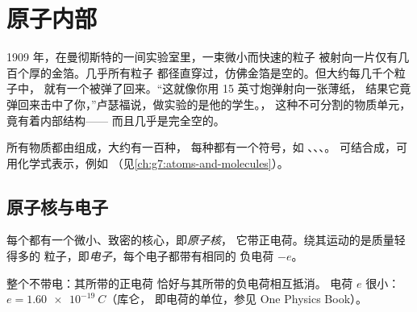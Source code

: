 \chapter{原子内部}\label{ch:g9:inside-the-atom}

1909 年，在曼彻斯特的一间实验室里，一束微小而快速的粒子
被射向一片仅有几百个厚的金箔。几乎所有粒子
都径直穿过，仿佛金箔是空的。但大约每几千个粒子中，
就有一个被弹了回来。“这就像你用 15 英寸炮弹射向一张薄纸，
结果它竟弹回来击中了你，”卢瑟福说，做实验的是他的学生。，
这种不可分割的物质单元，
竟有着内部结构——
而且几乎是完全空的。

\begin{recall}
所有物质都由组成，大约有一百种，
每种都有一个符号，如 、、、。
可结合成，可用化学式表示，例如 
（见\cref{ch:g7:atoms-and-molecules}）。
\end{recall}

\section{原子核与电子}

\begin{definition}[原子核与电子]\label{def:g9:inside-the-atom:nucleus}
每个都有一个微小、致密的核心，即\emph{原子核}，
它带正电荷。绕其运动的是质量轻得多的
粒子，即\emph{电子}，每个电子都带有相同的
负电荷 $-e$。
\end{definition}

\begin{proposition}[原子呈电中性]\label{prop:g9:inside-the-atom:neutral}
整个不带电：其所带的正电荷
恰好与其所带的负电荷相互抵消。
电荷 $e$ 很小：$e = \qty{1.60e-19}{C}$（库仑，
即电荷的单位，参见 One Physics Book）。
\end{proposition}


